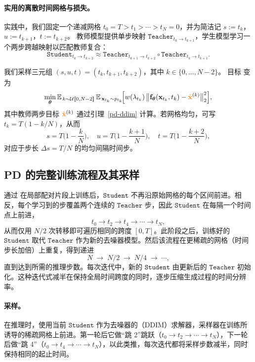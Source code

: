 \paragraph{实用的离散时间网格与损失。}
实践中，我们固定一个递减网格 $t_0=T>t_1>\cdots>t_N=0$，并为简洁记 $s:=t_k$，$u:=t_{k+1}$，$t:=t_{k+2}$。
教师模型提供单步映射 $\mathtt{Teacher}_{t_k\to t_{k+1}}$，学生模型学习一个两步跨越映射以匹配教师复合：
\[
\mathtt{Student}_{t_k\to t_{k+2}}
 \approx 
\mathtt{Teacher}_{t_{k+1}\to t_{k+2}}
\circ
\mathtt{Teacher}_{t_{k}\to t_{k+1}}.
\]

我们采样三元组 $(s,u,t)=(t_k,t_{k+1},t_{k+2})$，其中 $k\in\{0,\ldots,N-2\}$。
目标  变为
\[
\min_{\bm{\theta}} 
\mathbb{E}_{\,k \sim \mathcal{U}[\![0,N{-}2]\!]}\,
\mathbb{E}_{\,{\mathbf{x}}_{t_k}\sim p_{t_k}}\!
\Big[
  w(\lambda_{t_k})\,
  \big\|
  {\mathbf{f}}_{\bm{\theta}}({\mathbf{x}}_{t_k},t_k) - {\color{orange}\tilde{{\mathbf{x}}}}^{(k)}
  \big\|_2^2
\Big],
\]
其中教师两步目标 ${\color{orange}\tilde{{\mathbf{x}}}}^{(k)}$ 通过引理~\ref{pd-ddim} 计算。若网格均匀，可写 $t_k = T(1 - k/N)$，从而
\[
s = T\Big(1 - \frac{k}{N}\Big),\quad
u = T\Big(1 - \frac{k+1}{N}\Big),\quad
t = T\Big(1 - \frac{k+2}{N}\Big),
\]
对应于步长 $\Delta s =  T/N$ 的均匀间隔时间步。


\subsection{PD 的完整训练流程及其采样}\label{subsec:pd-training}
通过  在局部配对片段上训练后，$\mathtt{Student}$ 不再沿原始网格的每个区间前进。相反，每个学习到的步覆盖两个连续的 $\mathtt{Teacher}$ 步，因此 $\mathtt{Student}$ 在每隔一个时间点上前进，
\[
t_0 \to t_2 \to t_4 \to \cdots \to t_N,
\]
从而仅用 $N/2$ 次转移即可遍历相同的跨度 $[0,T]$。此阶段之后，训练好的 $\mathtt{Student}$ 取代 $\mathtt{Teacher}$ 作为新的去噪器模型。然后该流程在更稀疏的网格（时间步长加倍）上重复，得到递进
\[
N \;\to\; N/2 \;\to\; N/4 \;\to\; \cdots,
\]
直到达到所需的推理步数。每次迭代中，新的 $\mathtt{Student}$ 由更新后的 $\mathtt{Teacher}$ 初始化。这种迭代式减半在保持全局时间跨度的同时，逐步压缩生成过程的时间分辨率。

\paragraph{采样。}
在推理时，使用当前 $\mathtt{Student}$ 作为去噪器的（DDIM）求解器，采样器在训练所诱导的稀疏网格上前进。第一轮后它做“跳 2”跳跃（$t_0 \to t_2 \to \cdots \to t_N$），下一轮后做“跳 4”（$t_0 \to t_4 \to \cdots \to t_N$），以此类推，每次迭代都将采样步数减半，同时保持相同的起止时间。

